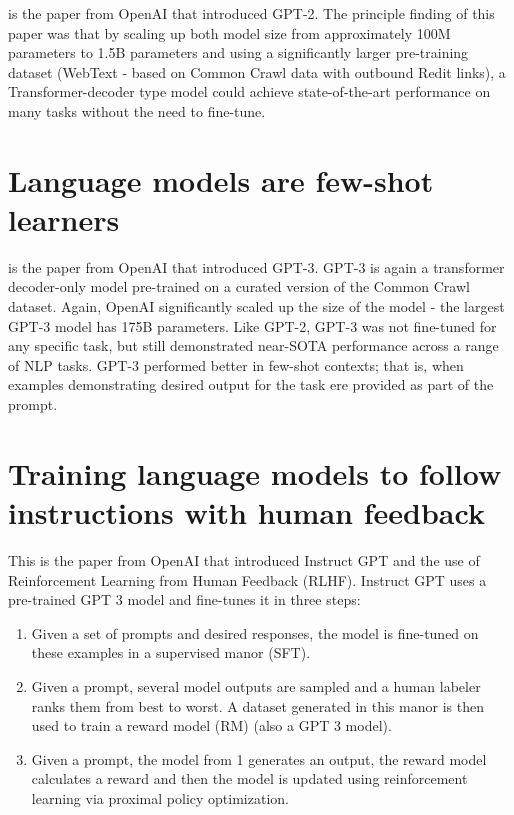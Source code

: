 \documentclass[11pt]{article}
\theoremstyle{definition}
\begin{document}
\cite{radford2019gpt2} is the paper from OpenAI that introduced GPT-2. The principle finding of this paper was that by scaling up both model size from approximately 100M parameters to 1.5B parameters and using a significantly larger pre-training dataset (WebText - based on Common Crawl data with outbound Redit links), a Transformer-decoder type model could achieve state-of-the-art performance on many tasks without the need to fine-tune.

\section{Language models are few-shot learners \cite{brown2020gpt3}}

\cite{brown2020gpt3} is the paper from OpenAI that introduced GPT-3. GPT-3 is again a transformer decoder-only model pre-trained on a curated version of the Common Crawl dataset. Again, OpenAI significantly scaled up the size of the model - the largest GPT-3 model has 175B parameters. Like GPT-2, GPT-3 was not fine-tuned for any specific task, but still demonstrated near-SOTA performance across a range of NLP tasks. GPT-3 performed better in few-shot contexts; that is, when examples demonstrating desired output for the task ere provided as part of the prompt.

\section{Training language models to follow instructions with human feedback \cite{ouyang2022training}}

This is the paper from OpenAI that introduced Instruct GPT and the use of Reinforcement Learning from Human Feedback (RLHF). Instruct GPT uses a pre-trained GPT 3 model and fine-tunes it in three steps:
\begin{enumerate}
\item Given a set of prompts and desired responses, the model is fine-tuned on these examples in a supervised manor (SFT).
\item Given a prompt, several model outputs are sampled and a human labeler ranks them from best to worst. A dataset generated in this manor is then used to train a reward model (RM) (also a GPT 3 model).
\item Given a prompt, the model from 1 generates an output, the reward model calculates a reward and then the model is updated using reinforcement learning via proximal policy optimization.
\end{enumerate}
\end{document}
